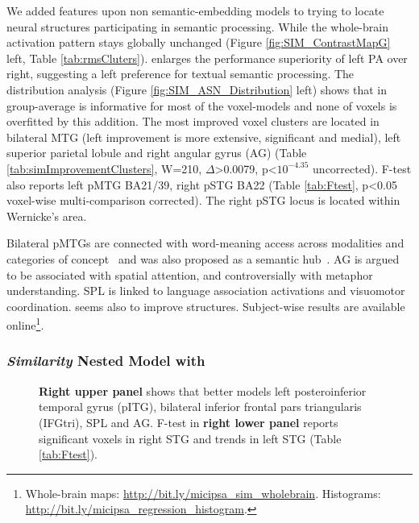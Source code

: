We added  features upon non semantic-embedding models to trying to locate neural structures participating in semantic \similarity processing. While the whole-brain activation pattern stays globally unchanged (Figure \ref{fig:SIM_ContrastMapG} left, Table \ref{tab:rmsCluters}).  enlarges the performance superiority of left PA over right, suggesting a left preference for textual semantic \similarity processing. The  distribution analysis (Figure \ref{fig:SIM_ASN_Distribution} left) shows that in group-average  is informative for most of the voxel-models and none of voxels is overfitted by this addition. The most improved voxel clusters are located in bilateral MTG (left improvement is more extensive, significant and medial), left superior parietal lobule and right angular gyrus (AG) (Table \ref{tab:simImprovementClusters}, W=210, \(\Delta\)>0.0079, p<\(10^{-4.35}\) uncorrected). F-test also reports left pMTG BA21/39, right pSTG BA22 (Table \ref{tab:Ftest}, p<0.05 voxel-wise multi-comparison corrected). The right pSTG locus is located within Wernicke's area. 

Bilateral pMTGs are connected with word-meaning access across modalities and categories of concept~\parencite{visserBothMiddleTemporal2012} and was also proposed as a semantic hub~\parencite{turkenNeuralArchitectureLanguage2011}. AG is argued to be associated with spatial attention, and controversially with metaphor understanding. SPL is linked to language association activations and visuomotor coordination.  seems also to improve \association structures. Subject-wise results are available online\footnote{Whole-brain maps: \url{http://bit.ly/micipsa_sim_wholebrain}. Histograms: \url{http://bit.ly/micipsa_regression_histogram}.}.

\subsubsection{\emph{Similarity} Nested Model with }

\begin{figure}
    \centering
        \caption[Encoding with  Features, Group]{\textbf{Right upper panel} shows that  better models left posteroinferior temporal gyrus (pITG), bilateral inferior frontal pars triangularis (IFGtri), SPL and AG. F-test in \textbf{right lower panel} reports significant voxels in right STG and trends in left STG (Table \ref{tab:Ftest}).} 
        \label{fig:SIG_ContrastMapG}
    \end{figure}
    

